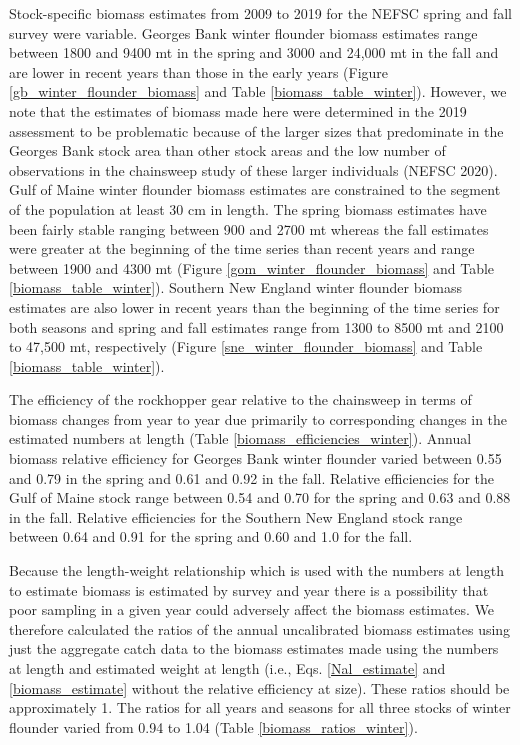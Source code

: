 \documentclass[]{article}
\begin{document}
Stock-specific biomass estimates from 2009 to 2019 for the NEFSC spring
and fall survey were variable. Georges Bank winter flounder biomass
estimates range between 1800 and 9400 mt in the spring and 3000 and
24,000 mt in the fall and are lower in recent years than those in the
early years (Figure \ref{gb_winter_flounder_biomass} and Table
\ref{biomass_table_winter}). However, we note that the estimates of
biomass made here were determined in the 2019 assessment to be
problematic because of the larger sizes that predominate in the Georges
Bank stock area than other stock areas and the low number of
observations in the chainsweep study of these larger individuals (NEFSC
2020). Gulf of Maine winter flounder biomass estimates are constrained
to the segment of the population at least 30 cm in length. The spring
biomass estimates have been fairly stable ranging between 900 and 2700
mt whereas the fall estimates were greater at the beginning of the time
series than recent years and range between 1900 and 4300 mt (Figure
\ref{gom_winter_flounder_biomass} and Table \ref{biomass_table_winter}).
Southern New England winter flounder biomass estimates are also lower in
recent years than the beginning of the time series for both seasons and
spring and fall estimates range from 1300 to 8500 mt and 2100 to 47,500
mt, respectively (Figure \ref{sne_winter_flounder_biomass} and Table
\ref{biomass_table_winter}).

The efficiency of the rockhopper gear relative to the chainsweep in
terms of biomass changes from year to year due primarily to
corresponding changes in the estimated numbers at length (Table
\ref{biomass_efficiencies_winter}). Annual biomass relative efficiency
for Georges Bank winter flounder varied between 0.55 and 0.79 in the
spring and 0.61 and 0.92 in the fall. Relative efficiencies for the Gulf
of Maine stock range between 0.54 and 0.70 for the spring and 0.63 and
0.88 in the fall. Relative efficiencies for the Southern New England
stock range between 0.64 and 0.91 for the spring and 0.60 and 1.0 for
the fall.

Because the length-weight relationship which is used with the numbers at
length to estimate biomass is estimated by survey and year there is a
possibility that poor sampling in a given year could adversely affect
the biomass estimates. We therefore calculated the ratios of the annual
uncalibrated biomass estimates using just the aggregate catch data to
the biomass estimates made using the numbers at length and estimated
weight at length (i.e., Eqs. \ref{Nal_estimate} and
\ref{biomass_estimate} without the relative efficiency at size). These
ratios should be approximately 1. The ratios for all years and seasons
for all three stocks of winter flounder varied from 0.94 to 1.04 (Table
\ref{biomass_ratios_winter}).
\end{document}
